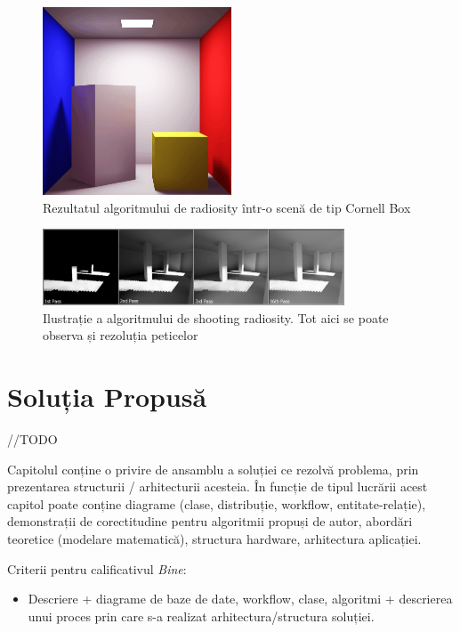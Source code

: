 \documentclass[12pt,a4paper]{report}
\numberwithin{equation}{section} %
\begin{document}
\begin{figure}[ht]
	\centering
	\includegraphics[width=0.5\textwidth]{pics/radiosity.png}
	\caption{Rezultatul algoritmului de radiosity într-o scenă de tip Cornell Box\protect{}}
	\label{fig:radiosity}
\end{figure}
\begin{figure}[ht]
	\centering
	\includegraphics[width=0.8\textwidth]{pics/shooting_radiosity.png}
	\caption{Ilustrație a algoritmului de shooting radiosity. Tot aici se poate observa și rezoluția peticelor\protect{}}
	\label{fig:shooting_radiosity}
\end{figure}

\chapter{\label{sec:solutie}Soluția Propusă}

//TODO

Capitolul conține o privire de ansamblu a soluției ce rezolvă problema, prin prezentarea structurii / arhitecturii acesteia. În funcție de tipul lucrării acest capitol poate conține diagrame (clase, distribuție, workflow, entitate-relație), demonstrații de corectitudine pentru algoritmii propuși de autor, abordări teoretice (modelare matematică), structura hardware, arhitectura aplicației.

Criterii pentru calificativul \textit{Bine}:
\begin{itemize}
	\item 	Descriere + diagrame de baze de date, workflow, clase, algoritmi + descrierea unui proces prin care s-a realizat arhitectura/structura soluției.
\end{itemize}
\end{document}
